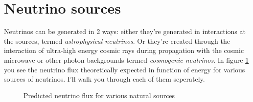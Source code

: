 \documentclass[11pt,a4paper,faculty=we,language=en,doctype=report]{cls/ugent-doc}
\begin{document}
\section{Neutrino sources}
Neutrinos can be generated in 2 ways: either they're generated in
interactions at the sources, termed \textit{astrophysical neutrinos}. Or
they're created through the interaction of ultra-high energy cosmic rays during
propagation with the cosmic microwave or other photon backgrounds termed
\textit{cosmogenic neutrinos}. 
In figure \ref{figure:Neutrino fluxes} you see the neutrino flux theoretically expected 
in function of energy for various sources of neutrinos. I'll walk you through each of
them seperately.
\begin{figure}
	\centering
	\caption{Predicted neutrino flux for various natural sources}
	\label{figure:Neutrino fluxes}
\end{figure}
\end{document}

